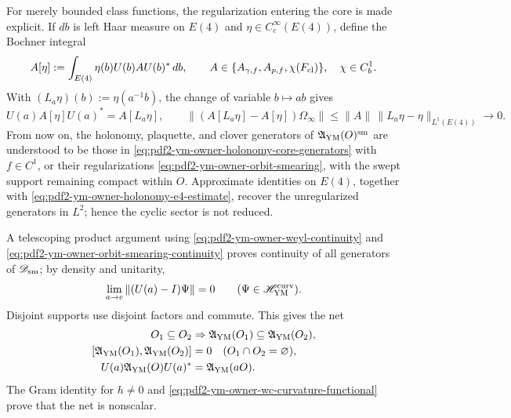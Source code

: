 For merely bounded class functions, the regularization entering the core is
made explicit. If $d b$ is left Haar measure on $E(4)$ and
$\eta\in C_c^\infty(E(4))$, define the Bochner integral
\begin{equation}\label{eq:pdf2-ym-owner-orbit-smearing}
 A[\eta]:=\int_{E(4)}\eta(b)U(b)AU(b)^*\,db,
 \qquad A\in\{A_{\gamma,f},A_{p,f},\chi(F_{{\rm cl}})\},
 \quad \chi\in C_b^1.
\end{equation}
With $(L_a\eta)(b):=\eta(a^{-1}b)$, the change of variable $b\mapsto ab$ gives
\begin{equation}\label{eq:pdf2-ym-owner-orbit-smearing-continuity}
 U(a)A[\eta]U(a)^*=A[L_a\eta],
 \qquad
 \|(A[L_a\eta]-A[\eta])\Omega_\infty\|
 \le\|A\|\,\|L_a\eta-\eta\|_{L^1(E(4))}\longrightarrow0.
\end{equation}
From now on, the holonomy, plaquette, and clover generators of
$\mathfrak A_{\rm YM}(O)^{\rm sm}$ are understood to be those in
\eqref{eq:pdf2-ym-owner-holonomy-core-generators} with $f\in C^1$, or their
regularizations \eqref{eq:pdf2-ym-owner-orbit-smearing}, with the swept support
remaining compact within $O$. Approximate identities on $E(4)$,
together with \eqref{eq:pdf2-ym-owner-holonomy-e4-estimate}, recover the
unregularized generators in $L^2$; hence the cyclic sector is not reduced.

A telescoping product argument using
\eqref{eq:pdf2-ym-owner-weyl-continuity} and
\eqref{eq:pdf2-ym-owner-orbit-smearing-continuity} proves continuity of all
generators of $\mathscr D_{\rm sm}$; by
density and unitarity,
\begin{equation}\label{eq:pdf2-ym-owner-strong-e4}
 \lim_{a\to e}\|(U(a)-I)\Psi\|=0
 \qquad(\Psi\in\mathscr H_{\rm YM}^{\rm curv}).
\end{equation}
Disjoint supports use disjoint factors and commute. This gives the net
\begin{equation}\label{eq:pdf2-ym-owner-local-net}
\begin{aligned}
 O_1\subseteq O_2&\Rightarrow
 \mathfrak A_{\rm YM}(O_1)\subseteq\mathfrak A_{\rm YM}(O_2),\\
 [\mathfrak A_{\rm YM}(O_1),\mathfrak A_{\rm YM}(O_2)]&=0
 \quad (O_1\cap O_2=\varnothing),\\
 U(a)\mathfrak A_{\rm YM}(O)U(a)^*&=\mathfrak A_{\rm YM}(aO).
\end{aligned}
\end{equation}
The Gram identity for $h\ne0$ and
\eqref{eq:pdf2-ym-owner-wc-curvature-functional} prove that the net is nonscalar.


